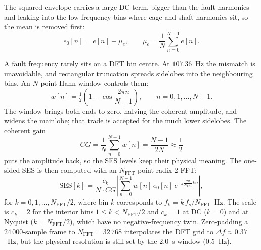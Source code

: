 The squared envelope carries a large DC term, bigger than the fault harmonics
and leaking into the low-frequency bins where cage and shaft harmonics sit, so
the mean is removed first:
\begin{equation}
  e_0[n] = e[n] - \mu_e, \qquad
  \mu_e = \frac{1}{N}\sum_{n=0}^{N-1}e[n].
  \label{eq:emean}
\end{equation}

A fault frequency rarely sits on a DFT bin centre. At $107.36$~Hz the mismatch
is unavoidable, and rectangular truncation spreads sidelobes into the
neighbouring bins. An $N$-point Hann window controls them:
\begin{equation}
  w[n] = \tfrac12\left(1-\cos\frac{2\pi n}{N-1}\right),
  \qquad n = 0,1,\dots,N-1.
  \label{eq:hann}
\end{equation}
The window brings both ends to zero, halving the coherent amplitude, and widens
the mainlobe; that trade is accepted for the much lower sidelobes. The coherent
gain
\begin{equation}
  CG = \frac{1}{N}\sum_{n=0}^{N-1}w[n] = \frac{N-1}{2N} \approx \frac{1}{2}
  \label{eq:cg}
\end{equation}
puts the amplitude back, so the SES levels keep their physical meaning. The
one-sided SES is then computed with an
$N_{\text{FFT}}$-point radix-2 FFT:
\begin{equation}
  \text{SES}[k] = \frac{c_k}{N\cdot CG}\left|\sum_{n=0}^{N-1} w[n]\,e_0[n]\,
  e^{-j\frac{2\pi}{N_{\text{FFT}}}kn}\right|,
  \label{eq:ses}
\end{equation}
for $k=0,1,\dots,N_{\text{FFT}}/2$, where bin $k$ corresponds to
$f_k=k\,f_s/N_{\text{FFT}}$~Hz. The scale is $c_k=2$ for the interior bins
$1 \le k < N_{\text{FFT}}/2$ and $c_k=1$ at DC ($k=0$) and at Nyquist
($k=N_{\text{FFT}}/2$), which have no negative-frequency twin. Zero-padding a
$24\,000$-sample frame to $N_{\text{FFT}}=32\,768$ interpolates the DFT grid to
$\Delta f\approx0.37$~Hz, but the physical resolution is still set by the
$2.0$~s window ($0.5$~Hz).
